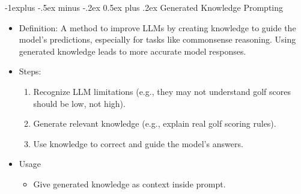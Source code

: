\documentclass[10pt,landscape]{article}
\makeatletter
\renewcommand{\subsection}{\@startsection{subsection}{2}{0mm}%
                                {-1explus -.5ex minus -.2ex}%
                                {0.5ex plus .2ex}%
                                {\normalfont\normalsize\bfseries}}
\makeatother
\begin{document}
\begin{multicols}{3}
\subsection{Generated Knowledge Prompting}
\begin{itemize}
    \item Definition: A method to improve LLMs by creating knowledge to guide the model's predictions, especially for tasks like commonsense reasoning. Using generated knowledge leads to more accurate model responses.
    \item Steps:
    \begin{enumerate}
        \item Recognize LLM limitations (e.g., they may not understand golf scores should be low, not high).
        \item Generate relevant knowledge (e.g., explain real golf scoring rules).
        \item Use knowledge to correct and guide the model's answers.
    \end{enumerate}
    \item Usage
    \begin{itemize}
        \item Give generated knowledge as context inside prompt.
    \end{itemize}
\end{itemize}


% 
%   
%   
%   
%   
%   


\end{multicols}
\end{document}
